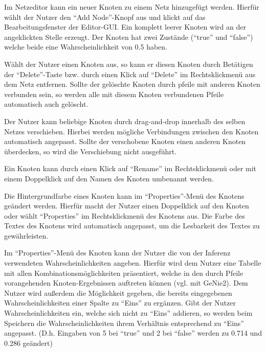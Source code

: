 \documentclass[parskip=full,11pt,twoside]{scrartcl}
\begin{document}
Im Netzeditor kann ein neuer Knoten zu einem Netz hinzugefügt werden. Hierfür wählt der Nutzer den \enquote{Add Node}-Knopf aus und klickt auf das Bearbeitungsfenster der Editor-GUI. Ein komplett leerer Knoten wird an der angeklickten Stelle erzeugt.
Der Knoten hat zwei Zustände (\enquote{true} und \enquote{false}) welche beide eine Wahrscheinlichkeit von 0.5 haben.


Wählt der Nutzer einen Knoten aus, so kann er diesen Knoten durch Betätigen der \enquote{Delete}-Taste bzw. durch einen Klick auf \enquote{Delete} im Rechtsklickmenü aus dem Netz entfernen. Sollte der gelöschte Knoten durch \gls{pfeil}e mit anderen Knoten verbunden sein, so werden alle mit diesem Knoten verbundenen Pfeile automatisch auch gelöscht.

Der Nutzer kann beliebige Knoten durch \gls{drag-and-drop} innerhalb des selben Netzes verschieben. Hierbei werden mögliche Verbindungen zwischen den Knoten automatisch angepasst. Sollte der verschobene Knoten einen anderen Knoten überdecken, so wird die Verschiebung nicht ausgeführt.

Ein Knoten kann durch einen Klick auf \enquote{Rename} im Rechtsklickmenü oder mit einem Doppelklick auf den Namen des Knoten umbenannt werden.

Die Hintergrundfarbe eines Knoten kann im \enquote{Properties}-Menü des Knotens geändert werden. Hierfür macht der Nutzer einen Doppelklick auf den Knoten oder wählt \enquote{Properties} im Rechtsklickmenü des Knotens aus. Die Farbe des Textes des Knotens wird automatisch angepasst, um die Lesbarkeit des Textes zu gewährleisten. %

Im \enquote{Properties}-Menü des Knoten kann der Nutzer die von der Inferenz verwendeten Wahrscheinlichkeiten angeben. Hierfür wird dem Nutzer eine Tabelle mit allen Kombinationsmöglichkeiten präsentiert, welche in den durch Pfeile vorangehenden Knoten-Ergebnissen auftreten können (vgl. mit GeNie2). Dem Nutzer wird außerdem die Möglichkeit gegeben, die bereits eingegebenen Wahrscheinlichkeiten einer Spalte zu \enquote{Eins} zu ergänzen. Gibt der Nutzer Wahrscheinlichkeiten ein, welche sich nicht zu \enquote{Eins} addieren, so werden beim Speichern die Wahrscheinlichkeiten ihrem Verhältnis entsprechend zu \enquote{Eins} angepasst. (D.h. Eingaben von 5 bei \enquote{true} und 2 bei \enquote{false} werden zu 0.714 und 0.286 geändert)
\end{document}
